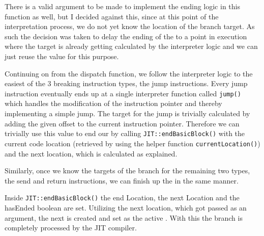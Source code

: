 There is a valid argument to be made to implement the \bb{} ending logic in this function as well, but I decided against this, since at this point of the interpretation process, we do not yet know the location of the branch target. As such the decision was taken to delay the ending of the \bbs{} to a point in execution where the target is already getting calculated by the interpreter logic and we can just reuse the value for this purpose. 

Continuing on from the dispatch function, we follow the interpreter logic to the easiest of the 3 breaking instruction types, the jump instructions. Every jump instruction eventually ends up at a single interpreter function called \texttt{jump()} which handles the modification of the instruction pointer and thereby implementing a simple jump.
The target for the jump is trivially calculated by adding the given offset to the current instruction pointer. Therefore we can trivially use this value to end our \bb{} by calling \texttt{JIT::endBasicBlock()} with the current code location (retrieved by using the helper function \texttt{currentLocation()}) and the next location, which is calculated as explained. 

Similarly, once we know the targets of the branch for the remaining two types, the send and return instructions, we can finish up the \bbs{} in the same manner.

Inside \texttt{JIT::endBasicBlock()} the end Location, the next Location and the hasEnded boolean are set. Utilizing the next location, which got passed as an argument, the next \bb{} is created and set as the active \bb{}. With this the branch is completely processed by the JIT compiler. 

